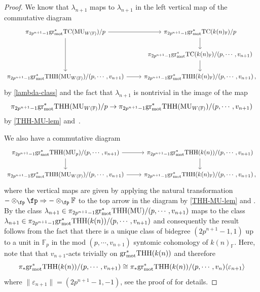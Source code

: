 \documentclass[english,10pt]{amsart}
\newcommand{\field}{\mathbb{F}}
\theoremstyle{definition}
\numberwithin{equation}{section}
\newcommand{\grmot}{\mathrm{gr}_{\textup{mot}}^*}
\begin{document}
\begin{proof}
We know that $\lambda_{n+1}$ maps to $\lambda_{n+1}$ in the left vertical map of the commutative diagram
\[
\begin{tikzcd}
\pi_{2p^{n+1}-1}\grmot\mathrm{TC}(\mathrm{MU}_{W(\field)})/p\arrow{dd} \arrow{r} &  \pi_{2p^{n+1}-1}\grmot\mathrm{TC}(k(n)_{\field})/p \arrow{d} \\ 
 &  \pi_{2p^{n+1}-1}\grmot\mathrm{TC}(k(n)_{\field})/(p,\cdots ,v_{n+1}) \arrow{d} \\ 
\pi_{2p^{n+1}-1}\grmot\mathrm{THH}(\mathrm{MU}_{W(\field)})/(p,\cdots,v_{n+1}) \arrow{r} & \pi_{2p^{n+1}-1}\grmot\mathrm{THH}(k(n)_{\field})/(p,\cdots ,v_{n+1}) \,,
\end{tikzcd}
\]
by \autoref{lambda-class} and the fact that $\lambda_{n+1}$ is nontrivial in the image of the map 
\[ \pi_{2p^{n+1}-1}\grmot\mathrm{THH}(\mathrm{MU}_{W(\field)})/p\to \pi_{2p^{n+1}-1}\grmot\mathrm{THH}(\mathrm{MU}_{W(\field)})/(p,\cdots,v_{n+1})\]
by \autoref{THH-MU-lem} and \cite[Proposition~2.2.6]{angelini2024syntomic}\,. 

We also have a commutative diagram 
\[
\begin{tikzcd}
\pi_{2p^{n+1}-1}\grmot\mathrm{THH}(\mathrm{MU}_{p})/(p,\cdots ,v_{n+1})\arrow{d} \arrow{r} &  \pi_{2p^{n+1}-1}\grmot\mathrm{THH}(k(n))/(p,\cdots, v_{n+1}) \arrow{d} \\ 
\pi_{2p^{n+1}-1}\grmot\mathrm{THH}(\mathrm{MU}_{W(\field)})/(p,\cdots ,v_{n+1}) \arrow{r} & \pi_{2p^{n+1}-1}\grmot\mathrm{THH}(k(n)_{\field})/(p,\cdots ,v_{n+1}) \,,
\end{tikzcd}
\]
where the vertical maps are given by applying the natural transformation $-\otimes_{\fp} \fp \Rightarrow - \otimes_{\fp} \field$ to the top arrow in the diagram by \autoref{THH-MU-lem} and  \cite[Theorem~4.5.2]{angelini2024syntomic}. 
By \cite[Theorem~2.5.12]{angelini2024syntomic} the class $\lambda_{n+1}\in \pi_{2p^{n+1}-1}\grmot\mathrm{THH}(\mathrm{MU})/(p,\cdots ,v_{n+1})$ maps to the class $\lambda_{n+1}\in \pi_{2p^{n+1}-1}\grmot\mathrm{THH}(k(n))/(p,\cdots ,v_{n+1})$ and consequently the result follows from the fact that there is a unique class of bidegree $(2p^{n+1}-1,1)$ up to a unit in $\field_p$ in the mod $(p,\cdots,v_{n+1})$ syntomic cohomology of $k(n)_{\field}$. 
Here, note that that $v_{n+1}$-acts trivially on $\grmot\mathrm{THH}(k(n))$ and therefore 
\[\pi_*\grmot \mathrm{THH}(k(n))/(p,\cdots ,v_{n+1})\cong \pi_*\grmot \mathrm{THH}(k(n))/(p,\cdots ,v_{n})\langle \varepsilon_{n+1}\rangle  
\]
where $\|\varepsilon_{n+1}\|=(2p^{n+1}-1,-1)$, see the proof of \cite[Theorem~2.5.14]{angelini2024syntomic} for details. 
\end{proof}
\end{document}
